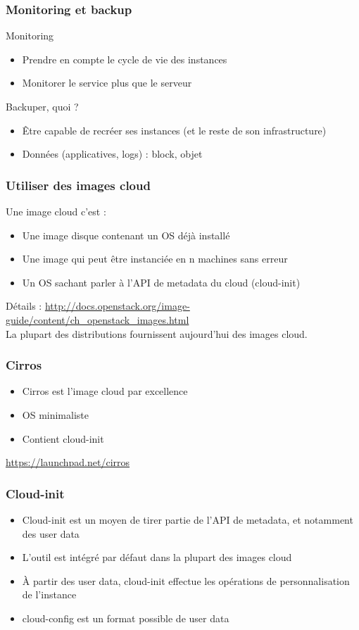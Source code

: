   \begin{frame}
    \frametitle{Monitoring et backup}
    Monitoring
    \begin{itemize}
      \item Prendre en compte le cycle de vie des instances
      \item Monitorer le service plus que le serveur
    \end{itemize}
    Backuper, quoi ?
    \begin{itemize}
      \item Être capable de recréer ses instances (et le reste de son infrastructure)
      \item Données (applicatives, logs) : block, objet
    \end{itemize}
  \end{frame}

  \begin{frame}
    \frametitle{Utiliser des images cloud}
    Une image cloud c'est :
    \begin{itemize}
      \item Une image disque contenant un OS déjà installé
      \item Une image qui peut être instanciée en n machines sans erreur
      \item Un OS sachant parler à l'API de metadata du cloud (cloud-init)
    \end{itemize}
    Détails : \url{http://docs.openstack.org/image-guide/content/ch\_openstack\_images.html}\\
    La plupart des distributions fournissent aujourd'hui des images cloud.
  \end{frame}

  \begin{frame}
    \frametitle{Cirros}
    \begin{itemize}
      \item Cirros est l'image cloud par excellence
      \item OS minimaliste
      \item Contient cloud-init
    \end{itemize}
    \url{https://launchpad.net/cirros}
  \end{frame}

  \begin{frame}
    \frametitle{Cloud-init}
    \begin{itemize}
      \item Cloud-init est un moyen de tirer partie de l'API de metadata, et notamment des user data
      \item L'outil est intégré par défaut dans la plupart des images cloud
      \item À partir des user data, cloud-init effectue les opérations de personnalisation de l'instance
      \item cloud-config est un format possible de user data
    \end{itemize}
  \end{frame}

